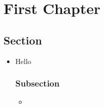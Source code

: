 \documentclass{inVerba-notes}
\begin{document}
\tableofcontents

\chapter{First Chapter}
\section{Section}
\begin{itemize}
    \item Hello
    \subsection{Subsection}
    \begin{itemize}
        \item 
    \end{itemize}
\end{itemize}
    
\end{document}
